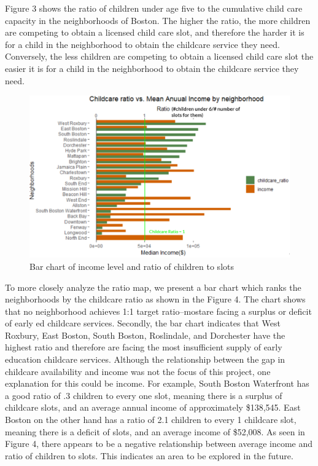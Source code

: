 \documentclass[10pt,letterpaper]{article}
\begin{document}
Figure 3 shows the ratio of children under age five to the cumulative
child care capacity in the neighborhoods of Boston. The higher the
ratio, the more children are competing to obtain a licensed child care
slot, and therefore the harder it is for a child in the neighborhood to
obtain the childcare service they need. Conversely, the less children
are competing to obtain a licensed child care slot the easier it is for
a child in the neighborhood to obtain the childcare service they need.

\begin{figure}

{\centering \includegraphics[width=0.8\linewidth]{income} 

}

\caption{Bar chart of income level and ratio of children to slots}\label{fig:unnamed-chunk-10}
\end{figure}

To more closely analyze the ratio map, we present a bar chart which
ranks the neighborhoods by the childcare ratio as shown in the Figure 4.
The chart shows that no neighborhood achieves 1:1 target ratio--mostare
facing a surplus or deficit of early ed childcare services. Secondly,
the bar chart indicates that West Roxbury, East Boston, South Boston,
Roslindale, and Dorchester have the highest ratio and therefore are
facing the most insufficient supply of early education childcare
services. Although the relationship between the gap in childcare
availability and income was not the focus of this project, one
explanation for this could be income. For example, South Boston
Waterfront has a good ratio of .3 children to every one slot, meaning
there is a surplus of childcare slots, and an average annual income of
approximately \$138,545. East Boston on the other hand has a ratio of
2.1 children to every 1 childcare slot, meaning there is a deficit of
slots, and an average income of \$52,008. As seen in Figure 4, there
appears to be a negative relationship between average income and ratio
of children to slots. This indicates an area to be explored in the
future.
\end{document}
